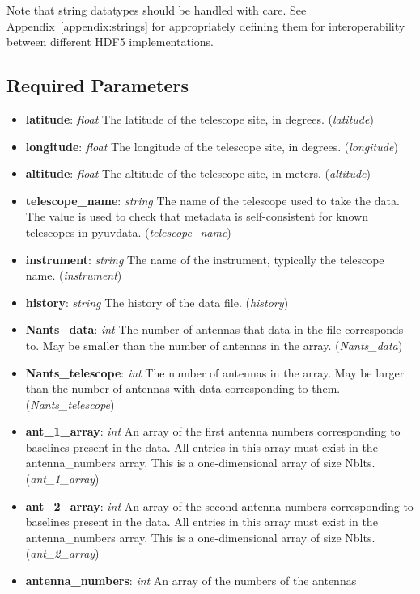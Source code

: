 \documentclass[11pt, oneside]{article}
\begin{document}
Note that string datatypes should be handled with care. See
Appendix~\ref{appendix:strings} for appropriately defining them for
interoperability between different HDF5 implementations.

\subsection{Required Parameters}
\label{sec:req_params}
\begin{itemize}
\item \textbf{latitude}: \textit{float} The latitude of the telescope site, in
  degrees. (\textit{latitude})
\item \textbf{longitude}: \textit{float} The longitude of the telescope site, in
  degrees. (\textit{longitude})
\item \textbf{altitude}: \textit{float} The altitude of the telescope site, in
  meters. (\textit{altitude})
\item \textbf{telescope\_name}: \textit{string} The name of the telescope used
  to take the data. The value is used to check that metadata is self-consistent
  for known telescopes in pyuvdata. (\textit{telescope\_name})
\item \textbf{instrument}: \textit{string} The name of the instrument, typically
  the telescope name. (\textit{instrument})
\item \textbf{history}: \textit{string} The history of the data
  file. (\textit{history})
\item \textbf{Nants\_data}: \textit{int} The number of antennas that data in the
  file corresponds to. May be smaller than the number of antennas in the
  array. (\textit{Nants\_data})
\item \textbf{Nants\_telescope}: \textit{int} The number of antennas in the
  array. May be larger than the number of antennas with data corresponding to
  them. (\textit{Nants\_telescope})
\item \textbf{ant\_1\_array}: \textit{int} An array of the first antenna numbers
  corresponding to baselines present in the data. All entries in this array must exist
  in the antenna\_numbers array. This is a one-dimensional
  array of size Nblts. (\textit{ant\_1\_array})
\item \textbf{ant\_2\_array}: \textit{int} An array of the second antenna numbers
  corresponding to baselines present in the data. All entries in this array must exist
  in the antenna\_numbers array. This is a one-dimensional
  array of size Nblts. (\textit{ant\_2\_array})
\item \textbf{antenna\_numbers}: \textit{int} An array of the numbers of the antennas

\end{itemize}
\end{document}
